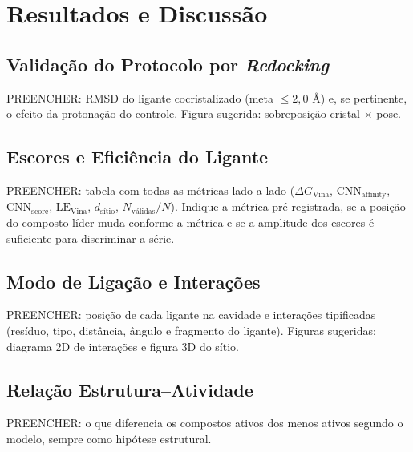 \section{Resultados e Discussão} \label{section: results}

\subsection{Validação do Protocolo por \textit{Redocking}}
PREENCHER: RMSD do ligante cocristalizado (meta $\le 2,0\text{ \AA}$) e, se pertinente, o efeito da protonação do controle. Figura sugerida: sobreposição cristal $\times$ pose.

\subsection{Escores e Eficiência do Ligante}
PREENCHER: tabela com todas as métricas lado a lado ($\Delta G_{\text{Vina}}$, $\text{CNN}_{\text{affinity}}$, $\text{CNN}_{\text{score}}$, $\text{LE}_{\text{Vina}}$, $d_{\text{sítio}}$, $N_{\text{válidas}}/N$). Indique a métrica pré-registrada, se a posição do composto líder muda conforme a métrica e se a amplitude dos escores é suficiente para discriminar a série.

\subsection{Modo de Ligação e Interações}
PREENCHER: posição de cada ligante na cavidade e interações tipificadas (resíduo, tipo, distância, ângulo e fragmento do ligante). Figuras sugeridas: diagrama 2D de interações e figura 3D do sítio.

\subsection{Relação Estrutura--Atividade}
PREENCHER: o que diferencia os compostos ativos dos menos ativos segundo o modelo, sempre como hipótese estrutural.
